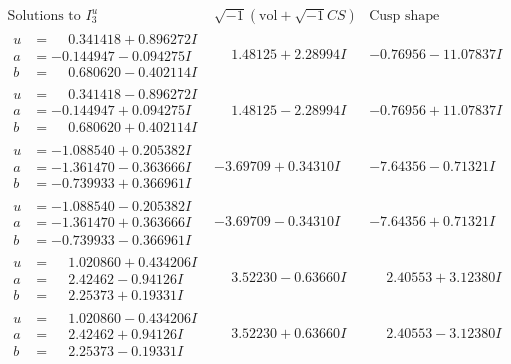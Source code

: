 \documentclass[1p]{elsarticle_modified}
\theoremstyle{definition}
\newcommand{\I}{\sqrt{-1}}
\begin{document}
$$\begin{array}{c|c|c}  
\text{Solutions to }I^u_{3}& \I (\text{vol} + \sqrt{-1}CS) & \text{Cusp shape}\\
 \hline 
\begin{aligned}
u &= \phantom{-}0.341418 + 0.896272 I \\
a &= -0.144947 - 0.094275 I \\
b &= \phantom{-}0.680620 - 0.402114 I\end{aligned}
 & \phantom{-}1.48125 + 2.28994 I & -0.76956 - 11.07837 I \\ \hline\begin{aligned}
u &= \phantom{-}0.341418 - 0.896272 I \\
a &= -0.144947 + 0.094275 I \\
b &= \phantom{-}0.680620 + 0.402114 I\end{aligned}
 & \phantom{-}1.48125 - 2.28994 I & -0.76956 + 11.07837 I \\ \hline\begin{aligned}
u &= -1.088540 + 0.205382 I \\
a &= -1.361470 - 0.363666 I \\
b &= -0.739933 + 0.366961 I\end{aligned}
 & -3.69709 + 0.34310 I & -7.64356 - 0.71321 I \\ \hline\begin{aligned}
u &= -1.088540 - 0.205382 I \\
a &= -1.361470 + 0.363666 I \\
b &= -0.739933 - 0.366961 I\end{aligned}
 & -3.69709 - 0.34310 I & -7.64356 + 0.71321 I \\ \hline\begin{aligned}
u &= \phantom{-}1.020860 + 0.434206 I \\
a &= \phantom{-}2.42462 - 0.94126 I \\
b &= \phantom{-}2.25373 + 0.19331 I\end{aligned}
 & \phantom{-}3.52230 - 0.63660 I & \phantom{-}2.40553 + 3.12380 I \\ \hline\begin{aligned}
u &= \phantom{-}1.020860 - 0.434206 I \\
a &= \phantom{-}2.42462 + 0.94126 I \\
b &= \phantom{-}2.25373 - 0.19331 I\end{aligned}
 & \phantom{-}3.52230 + 0.63660 I & \phantom{-}2.40553 - 3.12380 I \\ \hline\begin{aligned}

\end{aligned}
\end{array}$$
\end{document}

